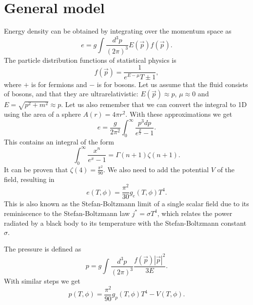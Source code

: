 \section{General model}
\iffalse
In general the pressure of the ultrarelativistic ASDF
\begin{equation}
p(T,\phi) = - \sum_B f_B (m(\phi),T) - \sum_F f_F (m(\phi),T)
\end{equation}
\fi

Energy density can be obtained by integrating over the momentum space as
\begin{equation}
e = g \int \frac{d^3 p}{(2 \pi)^3} E(\vec{p}) f(\vec{p}).
\end{equation}
The particle distribution functions of statistical physics is
\begin{equation}
f(\vec{p}) = \frac{1}{e^{E-\mu}{T} \pm 1},
\end{equation}
where $+$ is for fermions and $-$ is for bosons.
Let us assume that the fluid consists of bosons,
and that they are ultrarelativistic: $E(\vec{p}) \approx p$, $\mu \approx 0$ and $E = \sqrt{p^2 + m^2} \approx p$.
Let us also remember that we can convert the integral to 1D using the area of a sphere $A(r) = 4\pi r^2$.
With these approximations we get
\begin{equation}
e = \frac{g}{2 \pi^2} \int_0^\infty \frac{p^3 dp}{e^\frac{p}{T} - 1}.
\end{equation}
This contains an integral of the form
\cite[eq. B.36]{schroeder_thermal_2000}
\begin{equation}
\int_0^\infty \frac{x^n}{e^x - 1} = \Gamma(n+1) \zeta(n+1).
\end{equation}
It can be proven that $\zeta(4) = \frac{\pi^2}{90}$.
\cite[prob. B.19]{schroeder_thermal_2000}
We also need to add the potential $V$ of the field, resulting in
\cite[eq. S12]{borsanyi_lattice_2016}
\begin{equation}
e(T,\phi) = \frac{\pi^2}{30} g_e(T,\phi) T^4.
\end{equation}
This is also known as the Stefan-Boltzmann limit of a single scalar field due to its reminiscence to the Stefan-Boltzmann law $j^* = \sigma T^4$,
which relates the power radiated by a black body to its temperature with the Stefan-Boltzmann constant $\sigma$.

The pressure is defined as
\begin{equation}
p = g \int \frac{d^3 p}{(2 \pi)^3} \frac{f(\vec{p}) |\vec{p}|^2}{3E}.
\end{equation}
With similar steps we get
\begin{equation}
p(T,\phi) = \frac{\pi^2}{90} g_p(T,\phi) T^4 - V(T,\phi).
\end{equation}

